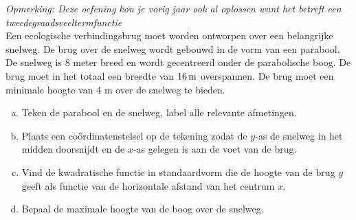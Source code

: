 \documentclass[12pt]{article}
\begin{document}
\begin{oefening}{\scriptsize\em Opmerking: Deze oefening kon je vorig jaar ook al oplossen want het betreft een tweedegraadsveeltermfunctie}\\
Een ecologische verbindingsbrug moet worden ontworpen over een belangrijke snelweg. De brug over de snelweg wordt gebouwd in de vorm van een parabool. De snelweg is 8 meter breed en wordt gecentreerd onder de parabolische boog. De brug moet in het totaal een breedte van $16 \m$ overspannen. De brug moet een minimale hoogte van 4 m over de snelweg te bieden.
\begin{enumerate}[(a)]
  \item Teken de parabool en de snelweg, label alle relevante afmetingen.
  \item Plaats een coördinatenstelsel op de tekening zodat de $y$-as de snelweg in het midden doorsnijdt en de $x$-as gelegen is aan de voet van de brug.
  \item Vind de kwadratische functie in standaardvorm die de hoogte van de brug $y$ geeft als functie van de horizontale afstand van het centrum $x$.
  \item Bepaal de maximale hoogte van de boog over de snelweg.
\end{enumerate}
\end{oefening}
\end{document}
